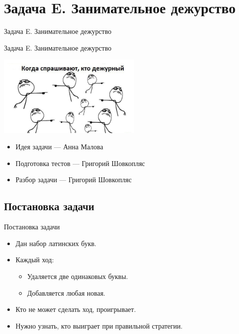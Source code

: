 \section{Задача E. Занимательное дежурство}

\begin{frame}[t]{Задача E. Занимательное дежурство}

  \begin{center}
    \LARGE Задача E. Занимательное дежурство
  \end{center}
  \begin{center}
      \includegraphics[width=7cm]{pics/duty.jpg}
  \end{center}
\end{frame}

\begin{frame}[t]{}
  \vspace{3cm}
  \begin{itemize}
    \item Идея задачи --- Анна Малова
    \item Подготовка тестов --- Григорий Шовкопляс
    \item Разбор задачи --- Григорий Шовкопляс
  \end{itemize}
\end{frame}

\subsection{Постановка задачи}

\begin{frame}[t]{Постановка задачи}
\begin{itemize}
    \item Дан набор латинских букв.
    \item Каждый ход:
        \begin{itemize}
             \item Удаляется две одинаковых буквы.
             \item Добавляется любая новая.
        \end{itemize}
    \item Кто не может сделать ход, проигрывает.
    \item Нужно узнать, кто выиграет при правильной стратегии.
\end{itemize}
\end{frame}

